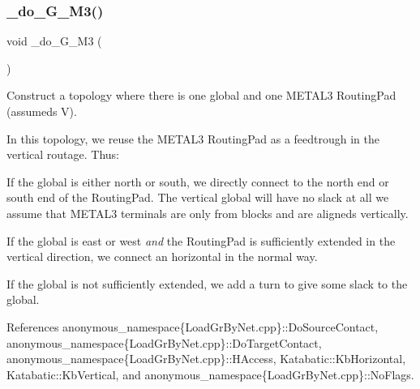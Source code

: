\mbox{\label{group__LoadGlobalRouting_ga2519ef984b3d19f123827a9b12651672}} 
\subsubsection{\texorpdfstring{\+\_\+do\+\_\+G\+\_\+M3()}{\_do\_1G\_1M3()}}
{\footnotesize\ttfamily void \+\_\+do\+\_\+G\+\_\+M3 (\begin{DoxyParamCaption}{ }\end{DoxyParamCaption})\hspace{0.3cm}{\ttfamily [private]}}

Construct a topology where there is one global and one {\ttfamily M\+E\+T\+A\+L3} Routing\+Pad (assumeds V).

In this topology, we reuse the {\ttfamily M\+E\+T\+A\+L3} Routing\+Pad as a feedtrough in the vertical routage. Thus\+:
\begin{DoxyItemize}
\item If the global is either north or south, we directly connect to the north end or south end of the Routing\+Pad. The vertical global will have no slack at all we assume that M\+E\+T\+A\+L3 terminals are only from blocks and are aligneds vertically.
\item If the global is east or west {\itshape and} the Routing\+Pad is sufficiently extended in the vertical direction, we connect an horizontal in the normal way.
\item If the global is not sufficiently extended, we add a turn to give some slack to the global.
\end{DoxyItemize}

 

References anonymous\+\_\+namespace\{\+Load\+Gr\+By\+Net.\+cpp\}\+::\+Do\+Source\+Contact, anonymous\+\_\+namespace\{\+Load\+Gr\+By\+Net.\+cpp\}\+::\+Do\+Target\+Contact, anonymous\+\_\+namespace\{\+Load\+Gr\+By\+Net.\+cpp\}\+::\+H\+Access, Katabatic\+::\+Kb\+Horizontal, Katabatic\+::\+Kb\+Vertical, and anonymous\+\_\+namespace\{\+Load\+Gr\+By\+Net.\+cpp\}\+::\+No\+Flags.

\mbox{\label{group__LoadGlobalRouting_ga007efc725aae31782204a44949765cb4}} 
